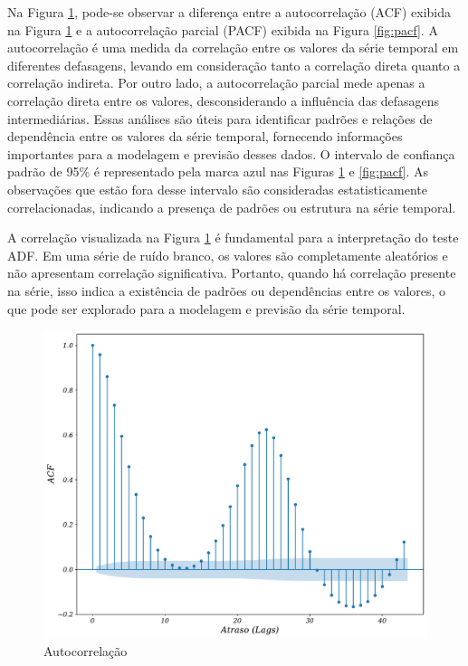 Na Figura \ref{fig:acfa}, pode-se observar a diferença entre a autocorrelação (ACF) exibida na Figura \ref{fig:acfa} e a autocorrelação parcial (PACF) exibida na Figura \ref{fig:pacf}. A autocorrelação é uma medida da correlação entre os valores da série temporal em diferentes defasagens, levando em consideração tanto a correlação direta quanto a correlação indireta. Por outro lado, a autocorrelação parcial mede apenas a correlação direta entre os valores, desconsiderando a influência das defasagens intermediárias. Essas análises são úteis para identificar padrões e relações de dependência entre os valores da série temporal, fornecendo informações importantes para a modelagem e previsão desses dados.
O intervalo de confiança padrão de 95\% é representado pela marca azul nas Figuras \ref{fig:acfa} e \ref{fig:pacf}. As observações que estão fora desse intervalo são consideradas estatisticamente correlacionadas, indicando a presença de padrões ou estrutura na série temporal.

A correlação visualizada na Figura \ref{fig:acfa} é fundamental para a interpretação do teste ADF. Em uma série de ruído branco, os valores são completamente aleatórios e não apresentam correlação significativa. Portanto, quando há correlação presente na série, isso indica a existência de padrões ou dependências entre os valores, o que pode ser explorado para a modelagem e previsão da série temporal.
\begin{figure}[!htb]
	\centering
	\caption{Autocorrelação}\label{fig:acfa}
	\includegraphics[width=0.7\linewidth]{Resultados/Figuras/acf} 
	
	
\end{figure}


